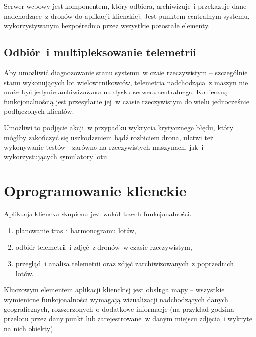 Serwer webowy jest komponentem, który odbiera, archiwizuje~i przekazuje
dane nadchodzące~z dronów do aplikacji klienckiej. Jest punktem centralnym systemu,
wykorzystywanym bezpośrednio przez wszystkie pozostałe elementy.

\subsection{Odbiór~i multipleksowanie telemetrii}

Aby umożliwić diagnozowanie stanu systemu~w czaie rzeczywistym -- szczególnie
stanu wykonujących lot wielowirnikowców, telemetria nadchodząca~z maszyn nie może być
jedynie archiwizowana na dysku serwera centralnego. Konieczną funkcjonalnością jest
przesyłanie jej~w czasie rzeczywistym do wielu jednocześnie podłączonych klientów.

Umożliwi to podjęcie akcji~w przypadku wykrycia krytycznego błędu, który mógłby
zakończyć się uszkodzeniem bądź rozbiciem drona, ułatwi też wykonywanie testów - zarówno
na rzeczywistych maszynach, jak~i wykorzystujących symulatory lotu.

\section{Oprogramowanie klienckie}

Aplikacja kliencka skupiona jest wokół trzech funkcjonalności:

\begin{enumerate}
    \item planowanie tras~i harmonogramu lotów,
    \item odbiór telemetrii~i zdjęć~z dronów~w czasie rzeczywistym,
    \item przegląd~i analiza telemetrii oraz zdjęć zarchiwizowanych~z poprzednich lotów.
\end{enumerate}

Kluczowym elementem aplikacji klienckiej jest obsługa mapy -- wszystkie
wymienione funkcjonalności wymagają wizualizacji nadchodzących danych geograficznych,
rozszerzonych~o dodatkowe informacje (na przykład godzina przelotu przez dany punkt lub
zarejestrowane~w danym miejscu zdjęcia~i wykryte na nich obiekty).